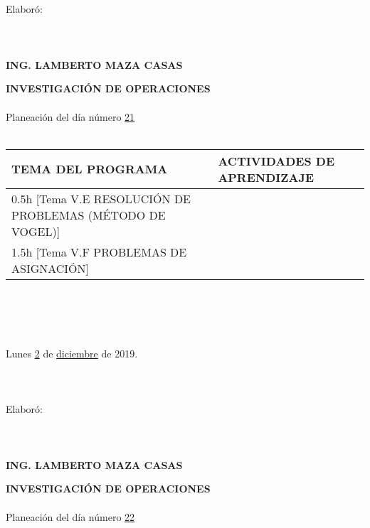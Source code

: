 \documentclass[landscape]{article}
\begin{document}
{\begin{center}
\ \\
\ \\
\ \\
\ \\
Elabor\'o:
\ \\
\ \\
\ \\
\ \\
{\bf ING. LAMBERTO MAZA CASAS}
\end{center}
\eject
\begin{center}
{\bf 
INVESTIGACI\'ON DE OPERACIONES
}
\ \\
\ \\
Planeaci\'on del d\'ia n\'umero \underline{\hspace{0.5cm}21\hspace{0.5cm}}
\ \\
\ \\
\begin{tabular}{|p{11cm}|p{8cm}|}\hline
{\bf TEMA DEL PROGRAMA}&{\bf ACTIVIDADES DE APRENDIZAJE}\\\hline
	0.5h	[Tema V.E RESOLUCI\'ON DE PROBLEMAS (M\'ETODO DE VOGEL)]
&\\
	1.5h	[Tema V.F PROBLEMAS DE ASIGNACI\'ON]
&\\
\hline
\end{tabular}
\ \\
\ \\
\ \\
\ \\
Lunes \underline{\hspace{0.5cm}2\hspace{0.5cm}} de  \underline{\hspace{0.5cm}diciembre\hspace{0.5cm}} de 2019.
\ \\
\ \\
\ \\
\ \\
Elabor\'o:
\ \\
\ \\
\ \\
\ \\
{\bf ING. LAMBERTO MAZA CASAS}
\end{center}
\eject
\begin{center}
{\bf 
INVESTIGACI\'ON DE OPERACIONES
}
\ \\
\ \\
Planeaci\'on del d\'ia n\'umero \underline{\hspace{0.5cm}22\hspace{0.5cm}}
\ \\

\end{center}}
\end{document}
